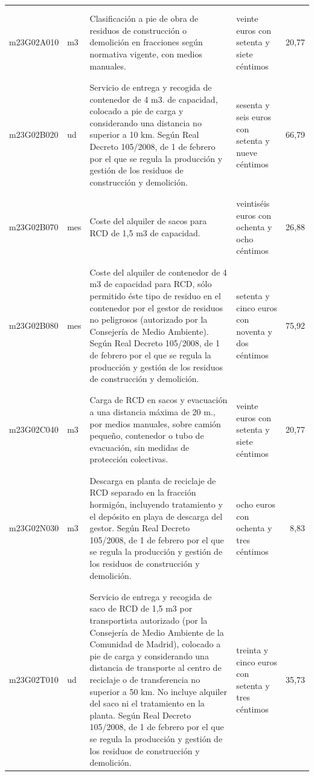 \documentclass{book}%
\begin{document}
\begin{supertabular}{|l|l|p{5cm}|p{3cm}|r|}
&&&&\\%
&&&&\\%
m23G02A010&m3&Clasificación a pie de obra de residuos de construcción o demolición en fracciones según normativa vigente, con medios manuales.&veinte euros con setenta y siete céntimos&20,77\\%
&&&&\\%
&&&&\\%
m23G02B020&ud&Servicio de entrega y recogida de contenedor de 4 m3. de capacidad, colocado a pie de carga y considerando una distancia no superior a 10 km. Según Real Decreto 105/2008, de 1 de febrero por el que se regula la producción y gestión de los residuos de construcción y demolición.&sesenta y seis euros con setenta y nueve céntimos&66,79\\%
&&&&\\%
&&&&\\%
m23G02B070&mes&Coste del alquiler de sacos para RCD de 1,5 m3 de capacidad.&veintiséis euros con ochenta y ocho céntimos&26,88\\%
&&&&\\%
&&&&\\%
m23G02B080&mes&Coste del alquiler de contenedor de 4 m3 de capacidad para RCD, sólo permitido éste tipo de residuo en el contenedor por el gestor de residuos no peligrosos (autorizado por la Consejería de Medio Ambiente). Según Real Decreto 105/2008, de 1 de febrero por el que se regula la producción y gestión de los residuos de construcción y demolición.&setenta y cinco euros con noventa y dos céntimos&75,92\\%
&&&&\\%
&&&&\\%
m23G02C040&m3&Carga de RCD en sacos y evacuación a una distancia máxima de 20 m., por medios manuales, sobre camión pequeño, contenedor o tubo de evacuación, sin medidas de protección colectivas.&veinte euros con setenta y siete céntimos&20,77\\%
&&&&\\%
&&&&\\%
m23G02N030&m3&Descarga en planta de reciclaje de RCD separado en la fracción hormigón, incluyendo tratamiento y el depósito en playa de descarga del gestor. Según Real Decreto 105/2008, de 1 de febrero por el que se regula la producción y gestión de los residuos de construcción y demolición.&ocho euros con ochenta y tres céntimos&8,83\\%
&&&&\\%
&&&&\\%
m23G02T010&ud&Servicio de entrega y recogida de saco de RCD de 1,5 m3 por transportista autorizado (por la Consejería de Medio Ambiente de la Comunidad de Madrid), colocado a pie de carga y considerando una distancia de transporte al centro de reciclaje o de transferencia no superior a 50 km. No incluye alquiler del saco ni el tratamiento en la planta. Según Real Decreto 105/2008, de 1 de febrero por el que se regula la producción y gestión de los residuos de construcción y demolición.&treinta y cinco euros con setenta y tres céntimos&35,73\\%

\end{supertabular}
\end{document}
